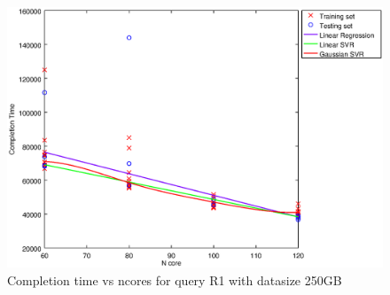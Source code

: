 
\begin {figure}[hbtp]
\centering
\includegraphics[width=\textwidth]{output/R1_250_ONLY_1_LINEAR_NCORE/plot_R1_250_bestmodels.eps}
\caption{Completion time vs ncores for query R1 with datasize 250GB}
\label{fig:only_1_linear_R1_250}
\end {figure}
